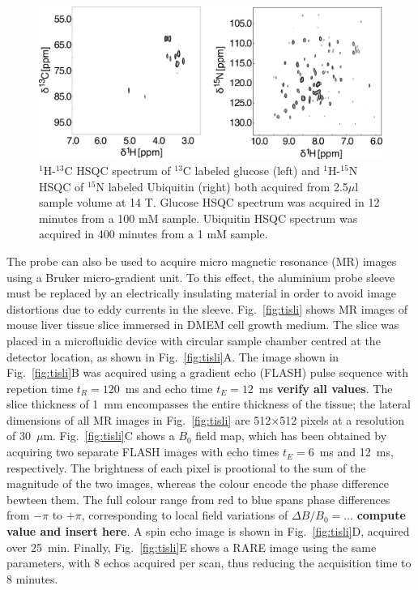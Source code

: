 \documentclass[preprint,12pt]{article}
\newcommand{\todo}[1]{{\color{red}\textbf{#1}}}
\newcommand{\fig}[1]{Fig.~\ref{#1}}
\begin{document}
\begin{figure}
\centering
\includegraphics[width=.7\linewidth,keepaspectratio=true]{./figures/ms5n17-tlp-sp-180612-HSQCspect.png} 
\caption{ $^1$H-$^{13}$C HSQC spectrum of $^{13}$C labeled glucose (left) and $^1$H-$^{15}$N HSQC of $^{15}$N labeled Ubiquitin (right) both acquired from 2.5$\mu$l sample volume at 14 T. Glucose HSQC spectrum was acquired in 12 minutes from a 100 mM sample. Ubiquitin HSQC spectrum was acquired in 400 minutes from a 1 mM sample.}
\label{fig:HSQC} 
\end{figure}
The probe can also be used to acquire micro magnetic resonance (MR) images using a Bruker micro-gradient unit. 
To this effect, the aluminium probe sleeve must be replaced by an electrically insulating material in order to 
avoid image distortions due to eddy currents in the sleeve. 
\fig{fig:tisli} shows MR images of mouse liver tissue slice 
immersed in DMEM cell growth medium.
The slice was placed in a microfluidic device with circular sample chamber centred at the detector location, as 
shown in \fig{fig:tisli}A. 
The image shown in \fig{fig:tisli}B was acquired using a gradient echo (FLASH) pulse sequence with repetion time
$t_R=120$~ms and echo time $t_E=12$~ms \todo{verify all values}. The slice thickness of  1~mm encompasses the entire thickness of the tissue; the 
lateral dimensions of all MR images in \fig{fig:tisli} are 512$\times$512 pixels
at a resolution of 30~$\mu$m.
\fig{fig:tisli}C shows a $B_0$ field map, which has been obtained by acquiring
two separate FLASH images with echo times $t_E=6$~ms and 12~ms, respectively.
The brightness of each pixel is prootional to the sum of the magnitude of
the two images, whereas the colour encode the phase difference bewteen them.
The full colour range from red to blue spans phase differences from $-\pi$ to
$+\pi$, corresponding to local field variations of $\Delta B/B_0=...$ 
\todo{compute value and insert here}.
A spin echo image is shown in \fig{fig:tisli}D, acquired over 25~min. Finally,
\fig{fig:tisli}E shows a RARE image using the same parameters, with 8 echos
acquired per scan, thus reducing the acquisition time to 8 minutes.
\end{document}

